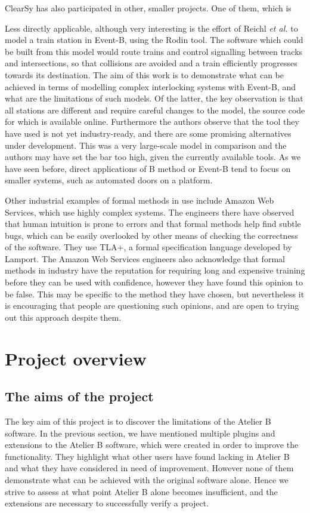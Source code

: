 \documentclass[11pt,journal]{IEEEtran}
\begin{document}
	ClearSy has also participated in other, smaller projects. One of them, which is 
	
	Less directly applicable, although very interesting is the effort of Reichl \textit{et al.} to model a train station in Event-B, using the Rodin tool\cite{station model}. The software which could be built from this model would route trains and control signalling between tracks and intersections, so that collisions are avoided and a train efficiently progresses towards its destination. The aim of this work is to demonstrate what can be achieved in terms of modelling complex interlocking systems with Event-B, and what are the limitations of such models. Of the latter, the key observation is that all stations are different and require careful changes to the model, the source code for which is available online. Furthermore the authors observe that the tool they have used is not yet industry-ready, and there are some promising alternatives under development. This was a very large-scale model in comparison and the authors may have set the bar too high, given the currently available tools. As we have seen before, direct applications of B method or Event-B tend to focus on smaller systems, such as automated doors on a platform.
	
	Other industrial examples of formal methods in use include Amazon Web Services, which use highly complex systems.\cite{amazon} The engineers there have observed that human intuition is prone to errors and that formal methods help find subtle bugs, which can be easily overlooked by other means of checking the correctness of the software. They use TLA+, a formal specification language developed by Lamport\cite{TLA}. The Amazon Web Services engineers also acknowledge that formal methods in industry have the reputation for requiring long and expensive training before they can be used with confidence, however they have found this opinion to be false. This may be specific to the method they have chosen, but nevertheless it is encouraging that people are questioning such opinions, and are open to trying out this approach despite them.

	\section{Project overview}
	\subsection{The aims of the project}
	The key aim of this project is to discover the limitations of the Atelier B software. In the previous section, we have mentioned multiple plugins and extensions to the Atelier B software, which were created in order to improve the functionality. They highlight what other users have found lacking in Atelier B and what they have considered in need of improvement. However none of them demonstrate what can be achieved with the original software alone. Hence we strive to assess at what point Atelier B alone becomes insufficient, and the extensions are necessary to successfully verify a project. 
		
\end{document}
